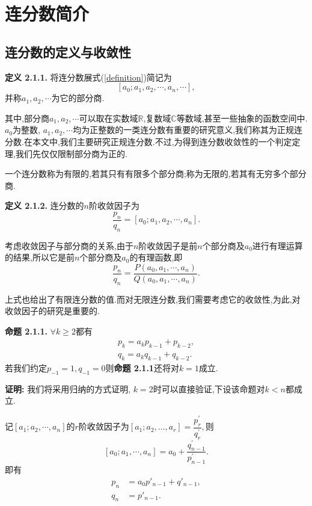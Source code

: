 \section{连分数简介}
\subsection{连分数的定义与收敛性}

\textbf{定义 2.1.1.  }
将连分数展式(\ref{definition})简记为
$$[a_0;a_1,a_2,\cdots,a_n,\cdots],$$
并称$a_1,a_2,\cdots$为它的部分商.\par
\par
其中,部分商$a_1,a_2,\cdots$可以取在实数域$\mathbb{R}$,复数域$\mathbb{C}$等数域,甚至一些抽象的函数空间中. $a_0$为整数, $a_1,a_2,\cdots$均为正整数的一类连分数有重要的研究意义,我们称其为正规连分数.在本文中,我们主要研究正规连分数.不过,为得到连分数收敛性的一个判定定理,我们先仅仅限制部分商为正的.\par
一个连分数称为有限的,若其只有有限多个部分商;称为无限的,若其有无穷多个部分商.\par
\textbf{定义 2.1.2.  }
连分数的$n$阶收敛因子为
$$\frac{p_n}{q_n}=[a_0;a_1,a_2,\cdots,a_n].$$
\par
考虑收敛因子与部分商的关系,由于$n$阶收敛因子是前$n$个部分商及$a_0$进行有理运算的结果,所以它是前$n$个部分商及$a_0$的有理函数,即
$$\frac{p_n}{q_n}=\frac{P(a_0,a_1,\cdots ,a_n)}{Q(a_0,a_1,\cdots ,a_n)}.$$\par
上式也给出了有限连分数的值.而对无限连分数,我们需要考虑它的收敛性,为此,对收敛因子的研究是重要的.\par
\textbf{命题 2.1.1.  }\textsuperscript{\cite{Khinchin}}
$\forall k\geqslant2$都有
    \begin{equation}\label{rfc}
        \begin{aligned}
        p_k=a_kp_{k-1}+p_{k-2},\\
        q_k=a_kq_{k-1}+q_{k-2}.
        \end{aligned}
    \end{equation}
若我们约定$p_{-1}=1,q_{-1}=0$则\textbf{命题 2.1.1}还将对$k=1$成立.
\par
\textbf{证明:  }
我们将采用归纳的方式证明, $k=2$时可以直接验证,下设该命题对$k<n$都成立.\par
记$[a_1;a_2,\cdots,a_n]$的$r$阶收敛因子为$[a_1;a_2,\ldots,a_r]=\dfrac{p_r^{'}}{q_r^{'}},$则
$$[a_0;a_1,\cdots,a_n]=a_0+\dfrac{q_{n-1}^{'}}{p_{n-1}^{'}}.$$
即有
    \begin{align*}
    p_n&=a_0p'_{n-1}+q'_{n-1},\\
    q_n&=p'_{n-1}.
    \end{align*}
